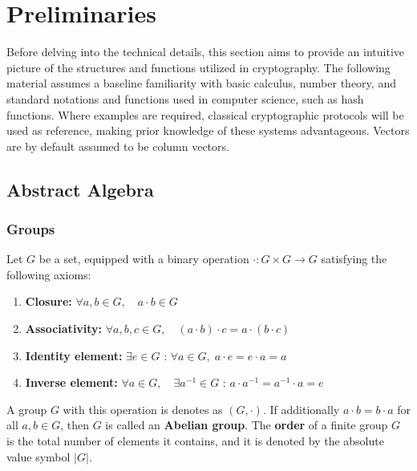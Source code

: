 \chapter{Preliminaries}

Before delving into the technical details, this section aims to provide an intuitive picture of the structures and functions utilized in cryptography. The following material assumes a baseline familiarity with basic calculus, number theory, and standard notations and functions used in computer science, such as hash functions. Where examples are required, classical cryptographic protocols will be used as reference, making prior knowledge of these systems advantageous. Vectors are by default assumed to be column vectors.

\section{Abstract Algebra}
\subsection{Groups}

\begin{definition}[Group] Let $G$ be a set, equipped with a binary operation $ \cdot : G \times G \to G $ satisfying the following axioms:

\begin{enumerate}
    \item \textbf{Closure:}
    $ \forall a,b \in G,\quad a \cdot b \in G $

    \item \textbf{Associativity:} $ \forall a,b,c \in G,\quad (a \cdot b)\cdot c = a \cdot (b \cdot c) $

    \item \textbf{Identity element:} $\exists e \in G \text{ : } \forall a \in G,\; a \cdot e = e \cdot a = a $

    \item \textbf{Inverse element:} $\forall a \in G,\quad \exists a^{-1} \in G \text{ : } a \cdot a^{-1} = a^{-1}\cdot a = e $
\end{enumerate}

A group $G$ with this operation is denotes as $(G, \cdot)$.
If additionally $ a \cdot b = b \cdot a $ for all $a,b \in G$, then $G$ is called an \textbf{Abelian group}.
The \textbf{order} of a finite group $G$ is the total number of elements it contains, and it is denoted by the absolute value symbol $|G|$.

\end{definition}


